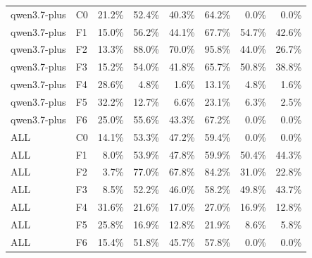 \begin{tabular}{llrrrrrr}
qwen3.7-plus & C0 & 21.2\% & 52.4\% & 40.3\% & 64.2\% & 0.0\% & 0.0\% \\
qwen3.7-plus & F1 & 15.0\% & 56.2\% & 44.1\% & 67.7\% & 54.7\% & 42.6\% \\
qwen3.7-plus & F2 & 13.3\% & 88.0\% & 70.0\% & 95.8\% & 44.0\% & 26.7\% \\
qwen3.7-plus & F3 & 15.2\% & 54.0\% & 41.8\% & 65.7\% & 50.8\% & 38.8\% \\
qwen3.7-plus & F4 & 28.6\% & 4.8\% & 1.6\% & 13.1\% & 4.8\% & 1.6\% \\
qwen3.7-plus & F5 & 32.2\% & 12.7\% & 6.6\% & 23.1\% & 6.3\% & 2.5\% \\
qwen3.7-plus & F6 & 25.0\% & 55.6\% & 43.3\% & 67.2\% & 0.0\% & 0.0\% \\
ALL & C0 & 14.1\% & 53.3\% & 47.2\% & 59.4\% & 0.0\% & 0.0\% \\
ALL & F1 & 8.0\% & 53.9\% & 47.8\% & 59.9\% & 50.4\% & 44.3\% \\
ALL & F2 & 3.7\% & 77.0\% & 67.8\% & 84.2\% & 31.0\% & 22.8\% \\
ALL & F3 & 8.5\% & 52.2\% & 46.0\% & 58.2\% & 49.8\% & 43.7\% \\
ALL & F4 & 31.6\% & 21.6\% & 17.0\% & 27.0\% & 16.9\% & 12.8\% \\
ALL & F5 & 25.8\% & 16.9\% & 12.8\% & 21.9\% & 8.6\% & 5.8\% \\
ALL & F6 & 15.4\% & 51.8\% & 45.7\% & 57.8\% & 0.0\% & 0.0\% \\
\bottomrule
\end{tabular}

